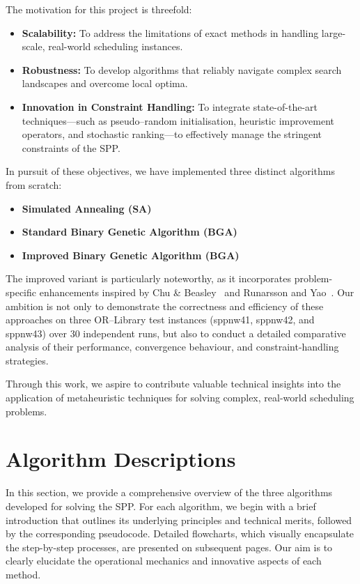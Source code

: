 \documentclass[12pt]{article}
\begin{document}
The motivation for this project is threefold:
\begin{itemize}
    \item \textbf{Scalability:} To address the limitations of exact methods in handling large-scale, real-world scheduling instances.
    \item \textbf{Robustness:} To develop algorithms that reliably navigate complex search landscapes and overcome local optima.
    \item \textbf{Innovation in Constraint Handling:} To integrate state-of-the-art techniques—such as pseudo–random initialisation, heuristic improvement operators, and stochastic ranking—to effectively manage the stringent constraints of the SPP.
\end{itemize}

In pursuit of these objectives, we have implemented three distinct algorithms from scratch:
\begin{itemize}
    \item \textbf{Simulated Annealing (SA)}
    \item \textbf{Standard Binary Genetic Algorithm (BGA)}
    \item \textbf{Improved Binary Genetic Algorithm (BGA)}
\end{itemize}
The improved variant is particularly noteworthy, as it incorporates problem-specific enhancements inspired by Chu \& Beasley~\cite{ChuAndBeasley1998} and Runarsson and Yao~\cite{RunarssonYao2000}. Our ambition is not only to demonstrate the correctness and efficiency of these approaches on three OR–Library test instances (sppnw41, sppnw42, and sppnw43) over 30 independent runs, but also to conduct a detailed comparative analysis of their performance, convergence behaviour, and constraint-handling strategies.

Through this work, we aspire to contribute valuable technical insights into the application of metaheuristic techniques for solving complex, real-world scheduling problems.

\section{Algorithm Descriptions}
\label{sec:algorithms}
In this section, we provide a comprehensive overview of the three algorithms developed for solving the SPP. For each algorithm, we begin with a brief introduction that outlines its underlying principles and technical merits, followed by the corresponding pseudocode. Detailed flowcharts, which visually encapsulate the step-by-step processes, are presented on subsequent pages. Our aim is to clearly elucidate the operational mechanics and innovative aspects of each method.
\end{document}
